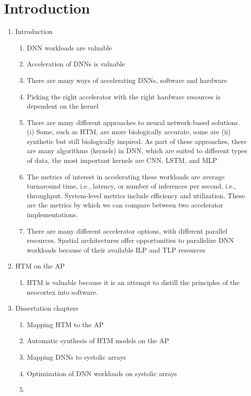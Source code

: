 \section{Introduction}

\begin{enumerate}
    \item Introduction
    \begin{enumerate}
        \item DNN workloads are valuable
        \item Acceleration of DNNs is valuable
        \item There are many ways of accelerating DNNs, software and hardware
        \item Picking the right accelerator with the right hardware resources is dependent on the kernel
        \item There are many different approaches to neural network-based solutions. (i) Some, such as HTM, are more biologically accurate, some are (ii) synthetic but still biologically inspired. As part of these approaches, there are many algorithms (kernels) in DNN, which are suited to different types of data, the most important kernels are CNN, LSTM, and MLP
        \item The metrics of interest in accelerating these workloads are average turnaround time, i.e., latency, or number of inferences per second, i.e., throughput. System-level metrics include efficiency and utilization. These are the metrics by which we can compare between two accelerator implementations. 
        \item There are many different accelerator options, with different parallel resources. Spatial architectures offer opportunities to parallelize DNN workloads because of their available ILP and TLP resources
    \end{enumerate}
    \item HTM on the AP
    \begin{enumerate}
        \item HTM is valuable because it is an attempt to distill the principles of the neocortex into software.
    \end{enumerate}
    \item Dissertation chapters
    \begin{enumerate}
        \item Mapping HTM to the AP
        \item Automatic synthesis of HTM models on the AP
        \item Mapping DNNs to systolic arrays
        \item Optimization of DNN workloads on systolic arrays
        \item 
    \end{enumerate}
\end{enumerate}

